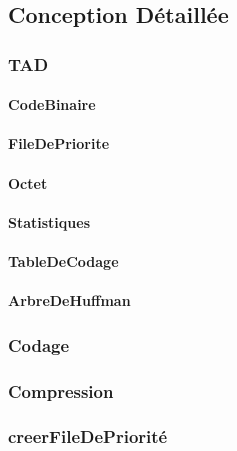  \subsection{Conception Détaillée}

 \subsubsection{TAD}
 \paragraph{CodeBinaire}
 
 \paragraph{FileDePriorite}
 
 \paragraph{Octet}
 
 \paragraph{Statistiques}
 
 \paragraph{TableDeCodage}
 
 \paragraph{ArbreDeHuffman}
 


 \subsubsection{Codage}
 

 \subsubsection{Compression}
 

 \subsubsection{creerFileDePriorité}
 

